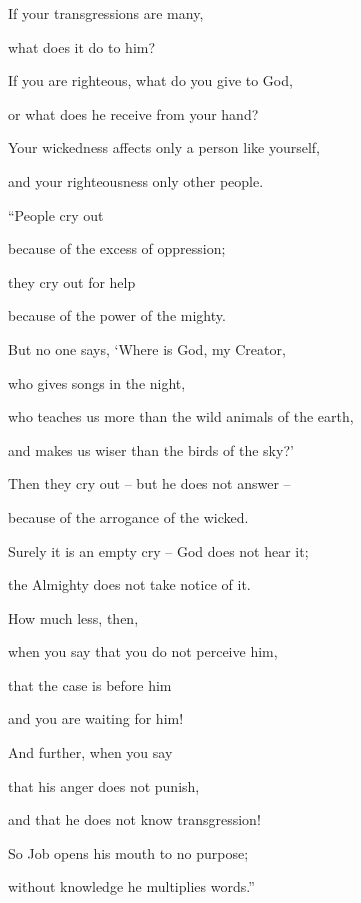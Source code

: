 {\par }{\Q If your transgressions
are many,
\par }{\Q what
does it do to him?
\par }{\Q {}If
you are righteous,
what
do you give
to God,
\par }{\Q or
what
does he receive
from your hand?
\par }{\Q {}Your wickedness
affects only a person
like yourself,
\par }{\Q and your righteousness
only other people.
\par }{\Q {}“People cry out
\par }{\Q because of the excess
of oppression;
\par }{\Q they cry out for help
\par }{\Q because of the power
of the mighty.
\par }{\Q {}But no
one says,
‘Where
is God,
my Creator,
\par }{\Q who gives
songs
in the night,
\par }{\Q {}who teaches
us more than the wild animals
of the earth,
\par }{\Q and makes us wiser
than the birds
of the sky?’
\par }{\Q {}Then they cry out
– but he does not
answer
–
\par }{\Q because
of the arrogance
of the wicked.
\par }{\Q {}Surely
it is an empty cry –
God
does not
hear
it;
\par }{\Q the Almighty
does not
take notice of it.
\par }{\Q {}How much
less,
then,
\par }{\Q when
you say
that you do not
perceive
him,
\par }{\Q that the case is before
him
\par }{\Q and you are waiting for him!
\par }{\Q {}And further,
when you say
\par }{\Q that
his anger
does not
punish,
\par }{\Q and that he does not
know
transgression!
\par }{\Q {}So Job
opens
his mouth
to no purpose;
\par }{\Q without
knowledge
he multiplies
words.”


}
